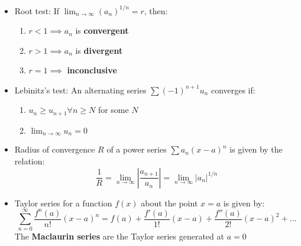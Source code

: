 \documentclass[a4paper]{article}
\begin{document}
\begin{itemize}
    \item Root test: If $\displaystyle\lim_{n\to\infty}\left(a_n\right)^{1/n}=r$, then:
    \begin{enumerate}
        \item $r<1 \implies a_n$ is \textbf{convergent}
        \item $r>1 \implies a_n$ is \textbf{divergent}
        \item $r=1 \implies$ \textbf{inconclusive}
    \end{enumerate}
    
    \item Lebinitz's test: An alternating series $\sum(-1)^{n+1}u_{n}$ converges if:
    \begin{enumerate}
        \item $u_n\geq u_{n+1}\forall n\geq N$ for some $N$
        \item $\displaystyle\lim_{n\to\infty}u_n=0$
    \end{enumerate}
    
    \item Radius of convergence $R$ of a power series $\sum a_n(x-a)^n$ is given by the relation:
    \begin{equation*}
        \frac{1}{R}=\lim_{n\to\infty}\left|\frac{a_{n+1}}{a_n}\right| = \lim_{n\to\infty}|a_n|^{1/n}
    \end{equation*}
    
    \item Taylor series for a function $f(x)$ about the point $x=a$ is given by:
    \begin{equation*}
        \sum_{n=0}^{\infty}\frac{f^n(a)}{n!}(x-a)^n = f(a)+\frac{f'(a)}{1!}(x-a)+\frac{f''(a)}{2!}(x-a)^2+\dots
    \end{equation*}
    The \textbf{Maclaurin series} are the Taylor series generated at $a=0$
\end{itemize}
\end{document}
